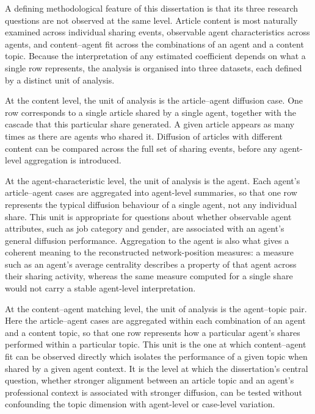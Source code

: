 A defining methodological feature of this dissertation is that its three research questions are not observed at the same level. Article content is most naturally examined across individual sharing events, observable agent characteristics across agents, and content–agent fit across the combinations of an agent and a content topic. Because the interpretation of any estimated coefficient depends on what a single row represents, the analysis is organised into three datasets, each defined by a distinct unit of analysis.

At the content level, the unit of analysis is the article–agent diffusion case. One row corresponds to a single article shared by a single agent, together with the cascade that this particular share generated. A given article appears as many times as there are agents who shared it. Diffusion of articles with different content can be compared across the full set of sharing events, before any agent-level aggregation is introduced.

At the agent-characteristic level, the unit of analysis is the agent. Each agent's article–agent cases are aggregated into agent-level summaries, so that one row represents the typical diffusion behaviour of a single agent, not any individual share. This unit is appropriate for questions about whether observable agent attributes, such as job category and gender, are associated with an agent's general diffusion performance. Aggregation to the agent is also what gives a coherent meaning to the reconstructed network-position measures: a measure such as an agent's average centrality describes a property of that agent across their sharing activity, whereas the same measure computed for a single share would not carry a stable agent-level interpretation.

At the content–agent matching level, the unit of analysis is the agent–topic pair. Here the article–agent cases are aggregated within each combination of an agent and a content topic, so that one row represents how a particular agent's shares performed within a particular topic. This unit is the one at which content–agent fit can be observed directly which isolates the performance of a given topic when shared by a given agent context. It is the level at which the dissertation's central question, whether stronger alignment between an article topic and an agent's professional context is associated with stronger diffusion, can be tested without confounding the topic dimension with agent-level or case-level variation.

